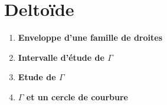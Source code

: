 \section{Deltoïde}
\begin{enumerate}
      \item \textbf{Enveloppe d'une famille de droites}
            

      \item \textbf{Intervalle d'étude de $\Gamma$}\\
            


      \item \textbf{Etude de $\Gamma$}
            


      \item \textbf{$\Gamma$ et un cercle de courbure}
            




\end{enumerate}

